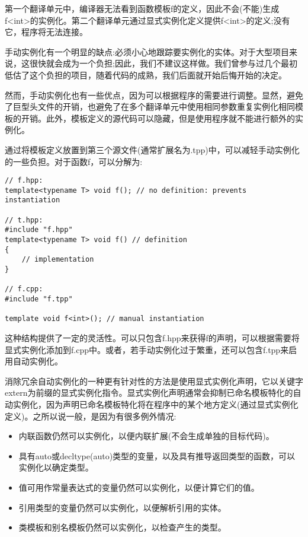 第一个翻译单元中，编译器无法看到函数模板f的定义，因此不会(不能)生成f<int>的实例化。第二个翻译单元通过显式实例化定义提供f<int>的定义;没有它，程序将无法连接。

手动实例化有一个明显的缺点:必须小心地跟踪要实例化的实体。对于大型项目来说，这很快就会成为一个负担;因此，我们不建议这样做。我们曾参与过几个最初低估了这个负担的项目，随着代码的成熟，我们后面就开始后悔开始的决定。

然而，手动实例化也有一些优点，因为可以根据程序的需要进行调整。显然，避免了巨型头文件的开销，也避免了在多个翻译单元中使用相同参数重复实例化相同模板的开销。此外，模板定义的源代码可以隐藏，但是使用程序就不能进行额外的实例化。

通过将模板定义放置到第三个源文件(通常扩展名为.tpp)中，可以减轻手动实例化的一些负担。对于函数f，可以分解为:

\begin{lstlisting}[style=styleCXX]
// f.hpp:
template<typename T> void f(); // no definition: prevents instantiation

// t.hpp:
#include "f.hpp"
template<typename T> void f() // definition
{
	// implementation
}

// f.cpp:
#include "f.tpp"

template void f<int>(); // manual instantiation
\end{lstlisting}

这种结构提供了一定的灵活性。可以只包含f.hpp来获得f的声明，可以根据需要将显式实例化添加到f.cpp中。或者，若手动实例化过于繁重，还可以包含f.tpp来启用自动实例化。


消除冗余自动实例化的一种更有针对性的方法是使用显式实例化声明，它以关键字extern为前缀的显式实例化指令。显式实例化声明通常会抑制已命名模板特化的自动实例化，因为声明已命名模板特化将在程序中的某个地方定义(通过显式实例化定义)。之所以说一般，是因为有很多例外情况:

\begin{itemize}
\item 
内联函数仍然可以实例化，以便内联扩展(不会生成单独的目标代码)。

\item 
具有auto或decltype(auto)类型的变量，以及具有推导返回类型的函数，可以实例化以确定类型。

\item 
值可用作常量表达式的变量仍然可以实例化，以便计算它们的值。

\item 
引用类型的变量仍然可以实例化，以便解析引用的实体。

\item 
类模板和别名模板仍然可以实例化，以检查产生的类型。
\end{itemize}

